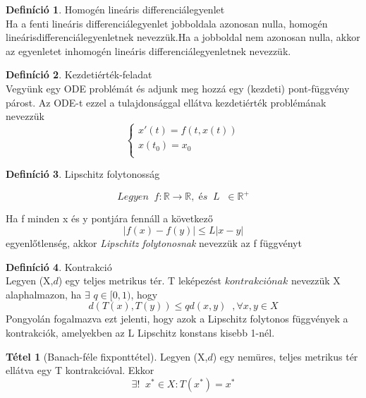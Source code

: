 \documentclass{article}
\theoremstyle{definition}
\theoremstyle{theorem}
\newtheorem{definition}{Definíció}
\newtheorem{theorem}{Tétel}
\begin{document}
\begin{definition}Homogén lineáris differenciálegyenlet\\
Ha a fenti lineáris differenciálegyenlet jobboldala azonosan nulla, homogén lineáris\newline differenciálegyenletnek nevezzük.Ha a jobboldal nem azonosan nulla, akkor az egyenletet inhomogén lineáris differenciálegyenletnek nevezzük.
\end{definition}
\begin{definition}{Kezdetiérték-feladat}\\
Vegyünk egy ODE problémát és adjunk meg hozzá egy (kezdeti) pont-függvény párost. Az ODE-t ezzel a tulajdonsággal ellátva kezdetiérték problémának  nevezzük
\begin{equation*}
    \begin{cases}
       x'(t) = f(t,x(t))\\
       x(t_0) = x_0 \\
    \end{cases}
\end{equation*}
\end{definition}
\begin{definition}{Lipschitz folytonosság}

\begin{equation*}
Legyen \;\;    f : \mathbb{R} \rightarrow \mathbb{R}, \; és \;\; L\; \;\in \mathbb{R}^+
\end{equation*}

Ha f minden x és y pontjára fennáll a következő
\begin{equation*}
    |f(x) - f(y)| \leq L |x-y|
\end{equation*}
egyenlőtlenség, akkor \textit{Lipschitz folytonosnak} nevezzük az f függvényt
\end{definition}
\begin{definition}{Kontrakció}\\
Legyen (X,$\textit{d}$) egy teljes metrikus tér. T leképezést $\textit{kontrakciónak}$ nevezzük X alaphalmazon, ha $\exists$ $q \in [0,1)$, hogy
\begin{equation*}
    d(T(x),T(y)) \leq q \textit{d}(x,y) \;\;,\forall x,y \in X
\end{equation*}
Pongyolán fogalmazva ezt jelenti, hogy azok a  Lipschitz folytonos függvények a kontrakciók, amelyekben az L Lipschitz konstans kisebb 1-nél.
\end{definition}
\begin{theorem}[Banach-féle fixponttétel]
Legyen (X,$\textit{d}$) egy nemüres, teljes metrikus tér ellátva egy T kontrakcióval. Ekkor
\begin{equation*}
    \exists!\;\; x^* \in X : T(x^*) = x^*
\end{equation*}
\end{theorem}
\end{document}

